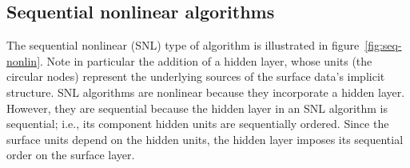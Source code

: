 

\subsection{Sequential nonlinear algorithms}
\label{subsec:seq-nonlin}
The sequential nonlinear (SNL) type of algorithm is illustrated in figure~\ref{fig:seq-nonlin}. 
Note in particular the addition of a hidden layer, whose units (the circular nodes)
represent the underlying sources of the surface data's implicit structure.
SNL algorithms are nonlinear because they incorporate a hidden layer.
However, they are sequential because the hidden layer in an SNL algorithm is sequential; i.e., its component hidden units
are sequentially ordered.
Since the surface units depend on the hidden units, the hidden layer imposes its sequential order on the surface layer. 

